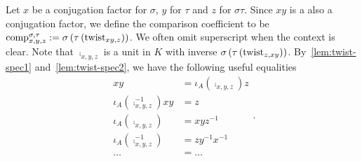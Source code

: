 \begin{construction}\label{con:compare-conj-factors}
  Let $x$ be a conjugation factor for $\sigma$, $y$ for $\tau$ and $z$ for $\sigma\tau$. Since $xy$ is a also a conjugation factor, we define the comparison coefficient to be $\operatorname{comp}^{\sigma, \tau}_{x,y,z}:=\sigma\left(\tau\left(\operatorname{twist}_{xy, z}\right)\right)$. We often omit superscript when the context is clear. Note that $\comp_{x,y,z}$ is a unit in $K$ with inverse $\sigma\left(\tau\left(\operatorname{twist}_{z, xy}\right)\right)$. By~\cref{lem:twist-spec1} and~\cref{lem:twist-spec2}, we have the following useful equalities
  \[
    \begin{aligned}
      xy &= \iota_{A}\left(\comp_{x,y,z}\right)z \\
      \iota_{A}\left(\comp_{x,y,z}^{-1}\right)xy &= z \\
      \iota_{A}\left(\comp_{x,y,z}\right) &= xyz^{-1}\\
      \iota_{A}\left(\comp_{x,y,z}^{-1}\right) &= zy^{-1}x^{-1}\\
      \dots &=\dots
    \end{aligned}.
  \]
  \leanok
\end{construction}

